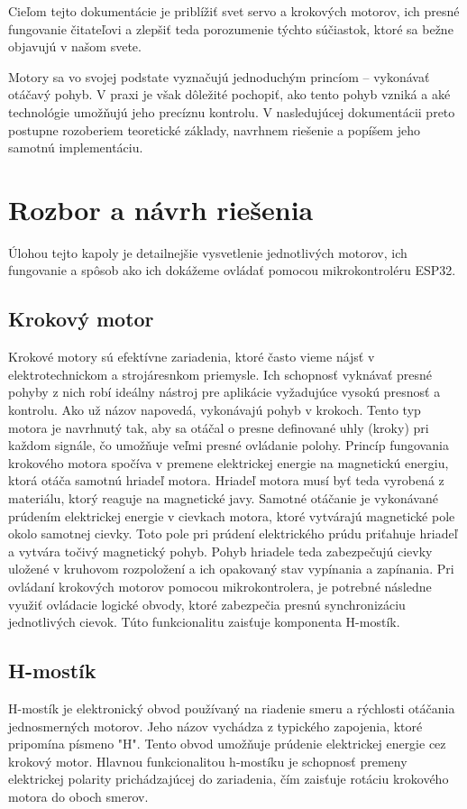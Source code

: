 \documentclass[a4paper, 11pt]{article}
\begin{document}
Cieľom tejto dokumentácie je priblížiť svet servo a krokových motorov, ich presné fungovanie čitateľovi a zlepšiť teda porozumenie týchto súčiastok, ktoré sa bežne objavujú v našom svete.

Motory sa vo svojej podstate vyznačujú jednoduchým princíom – vykonávať otáčavý pohyb. V praxi je však dôležité pochopiť, ako tento pohyb vzniká a aké technológie umožňujú jeho precíznu kontrolu. V nasledujúcej dokumentácii preto postupne rozoberiem teoretické základy, navrhnem riešenie a popíšem jeho samotnú implementáciu.

\clearpage
\section{Rozbor a návrh riešenia}
Úlohou tejto kapoly je detailnejšie vysvetlenie jednotlivých motorov, ich fungovanie a spôsob ako ich dokážeme ovládať pomocou mikrokontroléru ESP32.  

\subsection{Krokový motor}
Krokové motory sú efektívne zariadenia, ktoré často vieme nájsť v elektrotechnickom a strojáresnkom priemysle. Ich schopnosť vyknávať presné pohyby z nich robí ideálny nástroj pre aplikácie vyžadujúce vysokú presnosť a kontrolu. Ako už názov napovedá, vykonávajú pohyb v krokoch. Tento typ motora je navrhnutý tak, aby sa otáčal o presne definované uhly (kroky) pri každom signále, čo umožňuje veľmi presné ovládanie polohy. 
Princíp fungovania krokového motora spočíva v premene elektrickej energie na magnetickú energiu, ktorá otáča samotnú hriadeľ motora. Hriadeľ motora musí byť teda vyrobená z materiálu, ktorý reaguje na magnetické javy. Samotné otáčanie je vykonávané prúdením elektrickej energie v cievkach motora, ktoré vytvárajú magnetické pole okolo samotnej cievky. Toto pole pri prúdení elektrického prúdu priťahuje hriadeľ a vytvára točivý magnetický pohyb. Pohyb hriadele teda zabezpečujú cievky uložené v kruhovom rozpoložení a ich opakovaný stav vypínania a zapínania. Pri ovládaní krokových motorov pomocou mikrokontrolera, je potrebné následne využiť ovládacie logické obvody, ktoré zabezpečia presnú synchronizáciu jednotlivých cievok. Túto funkcionalitu zaisťuje komponenta H-mostík. 

\subsection{H-mostík}
H-mostík je elektronický obvod používaný na riadenie smeru a rýchlosti otáčania jednosmerných motorov. Jeho názov vychádza z typického zapojenia, ktoré pripomína písmeno "H". Tento obvod umožňuje prúdenie elektrickej energie cez krokový motor. Hlavnou funkcionalitou h-mostíku je schopnosť premeny elektrickej polarity prichádzajúcej do zariadenia, čím zaisťuje rotáciu krokového motora do oboch smerov.
\end{document}
